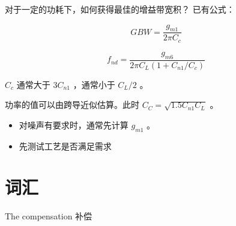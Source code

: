 \documentclass[cn,11pt,chinese,black,simple]{../elegantbook}
\begin{document}
对于一定的功耗下，如何获得最佳的增益带宽积？ 已有公式：

\[GBW = \frac{g_{m1}}{2 \pi C_c}\]

\[f_{nd} = \frac{g_{m6}}{2 \pi C_L (1 + C_{n1}/C_c)}\]

\(C_c\) 通常大于 \(3 C_{n1}\) ，通常小于 \(C_L / 2\) 。

功率的值可以由跨导近似估算。此时 \(C_C = \sqrt{1.5 C_{n1} C_L}\) 。

\begin{itemize}
    \item 对噪声有要求时，通常先计算 \(g_{m1}\) 。
    \item 先测试工艺是否满足需求
\end{itemize}
 
\section*{词汇}

The compensation 补偿


\let\chapname\undefined
\ifx\mainclass\undefined
\end{document}
